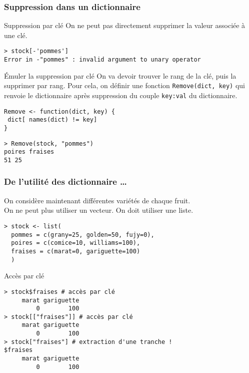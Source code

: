 \documentclass[10pt]{beamer}
\begin{document}
\begin{frame}[fragile]
  \frametitle{Suppression dans un dictionnaire}
  \begin{block}{Suppression par clé}
    On ne peut pas directement supprimer la valeur associée à une clé.
    \begin{lstlisting}[style=block]
> stock[-'pommes']
Error in -"pommes" : invalid argument to unary operator
\end{lstlisting}

  \end{block}

\begin{alertblock}{Émuler la suppression par clé}
  On va devoir trouver le rang de la clé, puis la supprimer par rang.
  Pour cela, on définir une fonction \texttt{Remove(dict, key)} qui renvoie le dictionnaire après suppression du couple \texttt{key:val} du dictionnaire.
  \begin{lstlisting}
Remove <- function(dict, key) {
 dict[ names(dict) != key]
}
\end{lstlisting}

\begin{lstlisting}
> Remove(stock, "pommes")
poires fraises
51 25
\end{lstlisting}
\end{alertblock}
\end{frame}


\begin{frame}[fragile]
  \frametitle{De l'utilité des dictionnaire \dots}
  On considère maintenant différentes variétés de chaque fruit.\\
  On ne peut plus utiliser un vecteur. On doit utiliser une liste.
  \begin{lstlisting}
> stock <- list(
  pommes = c(grany=25, golden=50, fujy=0),
  poires = c(comice=10, williams=100),
  fraises = c(marat=0, gariguette=100)
  )
\end{lstlisting}

\begin{block}{Accès par clé}
  \begin{lstlisting}[style=block]
> stock$fraises # accès par clé
     marat gariguette
         0        100
> stock[["fraises"]] # accès par clé
     marat gariguette
         0        100
> stock["fraises"] # extraction d'une tranche !
$fraises
     marat gariguette
         0        100
  \end{lstlisting}
\end{block}
\end{frame}
\end{document}
